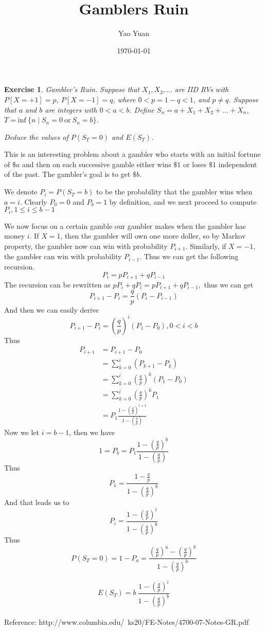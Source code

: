 \documentclass{article}
\title{Gamblers Ruin}
\author{Yao Yuan}
\date{\today}
\newtheorem{exercise}[theorem]{Exercise}
\begin{document}
\maketitle

\begin{tcolorbox}
    \begin{exercise} 
        Gambler's Ruin.
        Suppose that $X_1, X_2, ...$ are IID RVs with $P[X = +1] = p$, $P[X = -1] = q$, where $0 < p = 1 - q < 1$, and $p \neq q$.
        Suppose that $a$ and $b$ are integers with $0 < a < b$.
        Define $S_n = a + X_1 + X_2 + ... + X_n$, $T = \text{inf}~\{n \mid S_n = 0 ~\text{or}~ S_n = b\}$.

        Deduce the values of $P(S_T = 0)$ and $E(S_T)$.
    \end{exercise} 
\end{tcolorbox}

This is an interesting problem about a gambler who starts with an initial fortune of $\$ a$ and then on each successive gamble either wins $\$ 1$ or loses $\$ 1$ independent of the past. The gambler's goal is to get $\$ b$. 

We denote $P_i = P(S_T = b)$ to be the probability that the gambler wins when $a = i$. Clearly $P_{0}=0$ and $P_{b}=1$ by definition, and we next proceed to compute $P_{i}, 1 \leq i \leq b-1$

We now focus on a certain gamble our gambler makes when the gambler has money $i$. If $X = 1$, then the gambler will own one more doller, so by Markov property, the gambler now can win with probability $P_{i + 1}$. Similarly, if $X = -1$, the gambler can win with probability $P_{i - 1}$. Thus we can get the following recursion.
\[
    P_{i}=p P_{i+1}+q P_{i-1}
\]
The recursion can be rewritten as $p P_{i}+q P_{i}=p P_{i+1}+q P_{i-1},$ thus we can get
\[
    P_{i+1}-P_{i}=\frac{q}{p}\left(P_{i}-P_{i-1}\right)
\]
And then we can easily derive
\[
    P_{i+1}-P_{i} = (\frac{q}{p})^i (P_1 - P_0), 0 < i < b
\]
Thus
\[
    \begin{aligned}
    P_{i+1} & = P_{i+1} - P_0 \\
            & = \sum_{k = 0}^{i}\left(P_{k+1}-P_{k}\right) \\
            & = \sum_{k = 0}^{i}\left(\frac{q}{p}\right)^{k} (P_1 - P_0) \\
            & = \sum_{k = 0}^{i}\left(\frac{q}{p}\right)^{k} P_1 \\
            & = P_1 \frac{1 - (\frac{q}{p}) ^ {i + 1}} {1 - (\frac{q}{p})} 
    \end{aligned}
\]
Now we let $i = b - 1$, then we have
\[
    1 = P_b = P_1 \frac{1 - (\frac{q}{p}) ^ {b}} {1 - (\frac{q}{p})} 
\]
Thus
\[
    P_1 = \frac{1 - \frac{q}{p}} {1 - (\frac{q}{p}) ^ b}
\]
And that leads us to
\[
    P_i = \frac{1 - (\frac{q}{p}) ^ i} {1 - (\frac{q}{p}) ^ b}
\]
Thus
\[
    P(S_T = 0) = 1 - P_a = \frac{(\frac{q}{p}) ^ a - (\frac{q}{p}) ^ b} {1 - (\frac{q}{p}) ^ b}
\]

\[
    E(S_T) = b~\frac{1 - (\frac{q}{p}) ^ i} {1 - (\frac{q}{p}) ^ b}
\]
\\
Reference: http://www.columbia.edu/~ks20/FE-Notes/4700-07-Notes-GR.pdf
\end{document}
